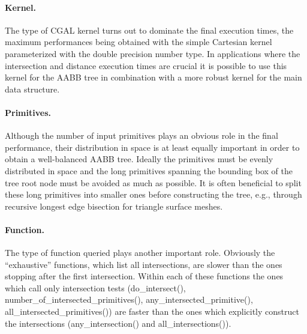 \paragraph{Kernel.} The type of CGAL kernel turns out to dominate the final execution times, the maximum performances being obtained with the simple Cartesian kernel parameterized with the double precision number type. In applications where the intersection and distance execution times are crucial it is possible to use this kernel for the AABB tree in combination with a more robust kernel for the main data structure.

\paragraph{Primitives.} Although the number of input primitives plays an obvious role in the final performance, their distribution in space is at least equally important in order to obtain a well-balanced AABB tree. Ideally the primitives must be evenly distributed in space and the long primitives spanning the bounding box of the tree root node must be avoided as much as possible. It is often beneficial to split these long primitives into smaller ones before constructing the tree, e.g., through recursive longest edge bisection for triangle surface meshes.

\paragraph{Function.} The type of function queried plays another important role. Obviously the ``exhaustive'' functions, which list all intersections, are slower than the ones stopping after the first intersection. Within each of these functions the ones which call only intersection tests (do\_intersect(), number\_of\_intersected\_primitives(), any\_intersected\_primitive(), all\_intersected\_primitives()) are faster than the ones which explicitly construct the intersections (any\_intersection() and all\_intersections()).

